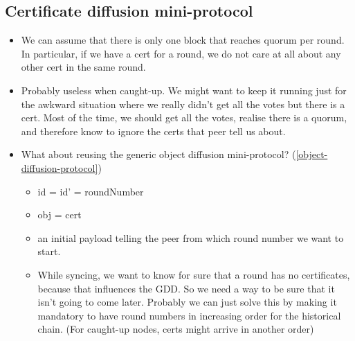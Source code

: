 \subsection{Certificate diffusion mini-protocol}

\begin{itemize}
\item We can assume that there is only one block that reaches quorum per round.
  In particular, if we have a cert for a round, we do not care at all about any
  other cert in the same round.

\item Probably useless when caught-up. We might want to keep it running just for
  the awkward situation where we really didn’t get all the votes but there is a
  cert. Most of the time, we should get all the votes, realise there is a
  quorum, and therefore know to ignore the certs that peer tell us about.

\item What about reusing the generic object diffusion mini-protocol?
  (\autoref{object-diffusion-protocol})
  \begin{itemize}
  \item id = id’ = roundNumber

  \item obj = cert

  \item an initial payload telling the peer from which round number we want to
    start.

  \item While syncing, we want to know for sure that a round has no
    certificates, because that influences the GDD. So we need a way to be sure
    that it isn’t going to come later. Probably we can just solve this by making
    it mandatory to have round numbers in increasing order for the historical
    chain. (For caught-up nodes, certs might arrive in another order)
\end{itemize}
\end{itemize}
